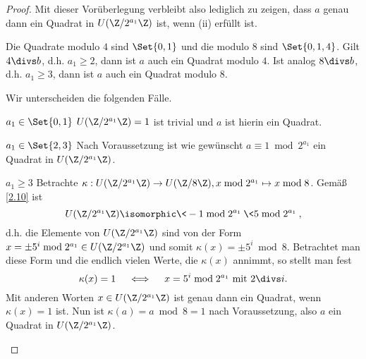 \begin{st}
\begin{proof}
		Mit dieser Vorüberlegung verbleibt also lediglich zu zeigen, dass $a$ genau dann ein Quadrat in $U(\Z / 2^{a_1} \Z)$ ist, wenn (ii) erfüllt ist.
		\begin{seg}{\ProofImplication}
			Die Quadrate modulo $4$ sind $\Set{0, 1}$ und die modulo $8$ sind $\Set{0, 1, 4}$.
			Gilt $4 \divs b$, d.h. $a_1 \ge 2$, dann ist $a$ auch ein Quadrat modulo $4$.
			Ist analog $8 \divs b$, d.h. $a_1 \ge 3$, dann ist $a$ auch ein Quadrat modulo $8$.
		\end{seg}
		\begin{seg}{\ProofImplication*}
			Wir unterscheiden die folgenden Fälle.
			\begin{segnb}{$a_1 \in \Set{0, 1}$}
				$U(\Z / 2^{a_1} \Z) = 1$ ist trivial und $a$ ist hierin ein Quadrat.
			\end{segnb}
			\begin{segnb}{$a_1 \in \Set{2, 3}$}
				Nach Voraussetzung ist wie gewünscht $a \equiv 1 \bmod 2^{a_1}$ ein Quadrat in $U(\Z / 2^{a_1} \Z)$.
			\end{segnb}
			\begin{segnb}{$a_1 \ge 3$}
				Betrachte $\kappa: U(\Z / 2^{a_1} \Z) \to U(\Z / 8\Z), x \bmod 2^{a_1} \mapsto x \bmod 8$.
				Gemäß \ref{2.10} ist
				\[
					U(\Z / 2^{a_1} \Z) \isomorphic \<-1 \bmod 2^{a_1}\> \<5 \bmod 2^{a_1}\>,
				\]
				d.h. die Elemente von $U(\Z / 2^{a_1} \Z)$ sind von der Form $x = \pm 5^i \bmod 2^{a_1} \in U(\Z / 2^{a_1} \Z)$ und somit $\kappa(x) = \pm 5^i \bmod 8$.
				Betrachtet man diese Form und die endlich vielen Werte, die $\kappa(x)$ annimmt, so stellt man fest
				\[
					\kappa(x) = 1 \quad\iff\quad x = 5^i \bmod 2^{a_1} \text{ mit } 2 \divs i.
				\]
				Mit anderen Worten $x \in U(\Z / 2^{a_1} \Z)$ ist genau dann ein Quadrat, wenn $\kappa(x) = 1$ ist.
				Nun ist $\kappa(a) = a \bmod 8 = 1$ nach Voraussetzung, also $a$ ein Quadrat in $U(\Z / 2^{a_1} \Z)$.
			\end{segnb}
		\end{seg}
	\end{proof}
\end{st}







